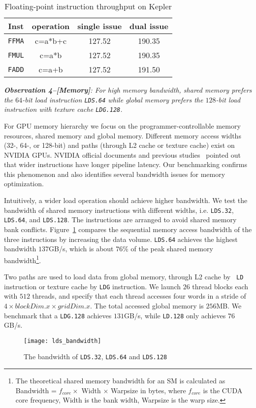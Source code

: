 \begin{table}[htbp]
\caption{Floating-point instruction throughput on Kepler}
\centering
\scalebox{0.8} {
\begin{tabular}{|c|c|c|c|}
\hline
Inst &operation&single issue&dual issue\\
\hline
{\tt FFMA} &c=a*b+c&127.52&190.35 \\
\hline
{\tt FMUL} &c=a*b&127.52&190.35 \\
\hline
{\tt FADD} &c=a+b&127.52&191.50\\
\hline
\end{tabular}
}
\label{tab:ffma}
\end{table}

{\em {\bf Observation 4--[Memory]}: For high memory bandwidth, shared memory prefers the $64$-bit load
instruction {\tt LDS.64} while global memory prefers the $128$-bit load instruction with texture cache {\tt LDG.128}.}

For GPU memory hierarchy we focus on the programmer-controllable memory resources, shared memory and global memory.
Different memory access widths (32-, 64-, or 128-bit) and paths (through L2 cache or texture cache) exist on NVIDIA GPUs.
NVIDIA official documents and previous studies~\cite{tan} pointed out that wider
instructions have longer pipeline latency.
Our benchmarking confirms this phenomenon and also identifies several bandwidth issues for memory optimization.

Intuitively, a wider load operation should achieve higher bandwidth.
We test the bandwidth of shared memory instructions with different widths, i.e. {\tt LDS.32}, {\tt LDS.64}, and {\tt LDS.128}.
The instructions are arranged to avoid shared memory bank conflicts.
Figure~\ref{fig:lds_bw} compares the sequential memory access bandwidth of the three instructions by increasing the data volume.
{\tt LDS.64} achieves the highest bandwidth $137$GB/s, which is about $76\%$ of the peak shared memory bandwidth\footnote{The
theoretical shared memory bandwidth for an SM is calculated as Bandwidth = $f_{core} \times$ Width $\times$ Warpsize in bytes, where $f_{core}$ is the CUDA core frequency, Width is the bank width, Warpsize is the warp size.}.

Two paths are used to load data from global memory, through L2 cache by {\tt
LD} instruction or texture cache by {\tt LDG} instruction.
We launch $26$ thread blocks each with $512$ threads, and specify that each thread accesses four words in a stride of $4 \times blockDim.x \times gridDim.x$.
The total accessed global memory is $256$MB.
We benchmark that a {\tt LDG.128} achieves $131$GB/s, while {\tt LD.128} only achieves $76$GB/s.

\begin{figure}[htbp]
\begin{center}
\texttt{[image: lds\_bandwidth]}
    \caption{ The bandwidth of {\tt LDS.32}, {\tt LDS.64} and {\tt LDS.128}}
\label{fig:lds_bw}
\end{center}
\end{figure}
